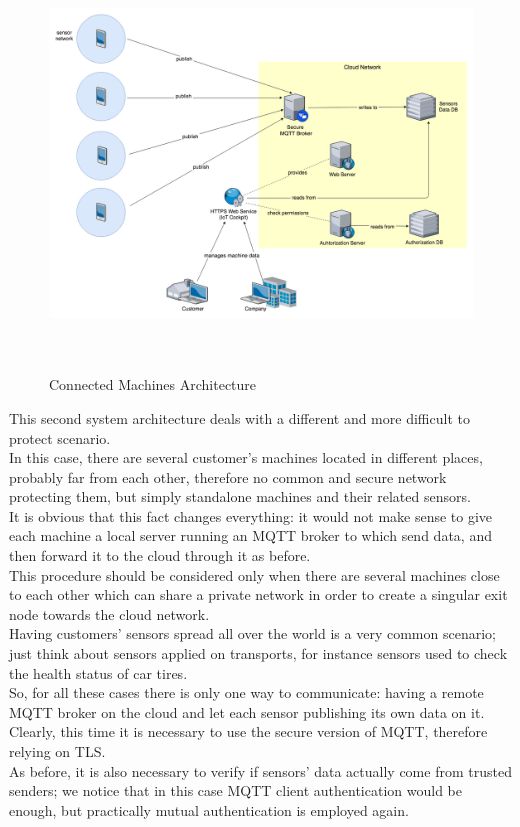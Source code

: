 \documentclass[12pt]{report}
\begin{document}
{{\begin{figure}[H]
\includegraphics[width=14cm,height=11cm,keepaspectratio]{connectedmachines_architecture}
\centering
\caption{Connected Machines Architecture}
\label{ssec:connectedmachines}
\end{figure}

This second system architecture deals with a different and more difficult to protect scenario.\\
In this case, there are several customer's machines located in different places, probably far from each other, therefore no common and secure network protecting them, but simply standalone machines and their related sensors.\\
It is obvious that this fact changes everything: it would not make sense to give each machine a local server running an MQTT broker to which send data, and then forward it to the cloud through it as before.\\
This procedure should be considered only when there are several machines close to each other which can share a private network in order to create a singular exit node towards the cloud network.\\

Having customers' sensors spread all over the world is a very common scenario; just think about sensors applied on transports, for instance sensors used to check the health status of car tires.\\

So, for all these cases there is only one way to communicate: having a remote MQTT broker on the cloud and let each sensor publishing its own data on it.\\
Clearly, this time it is necessary to use the secure version of MQTT, therefore relying on TLS.\\
As before, it is also necessary to verify if sensors' data actually come from trusted senders; we notice that in this case MQTT client authentication would be enough, but practically mutual authentication is employed again.\\

}}
\end{document}
